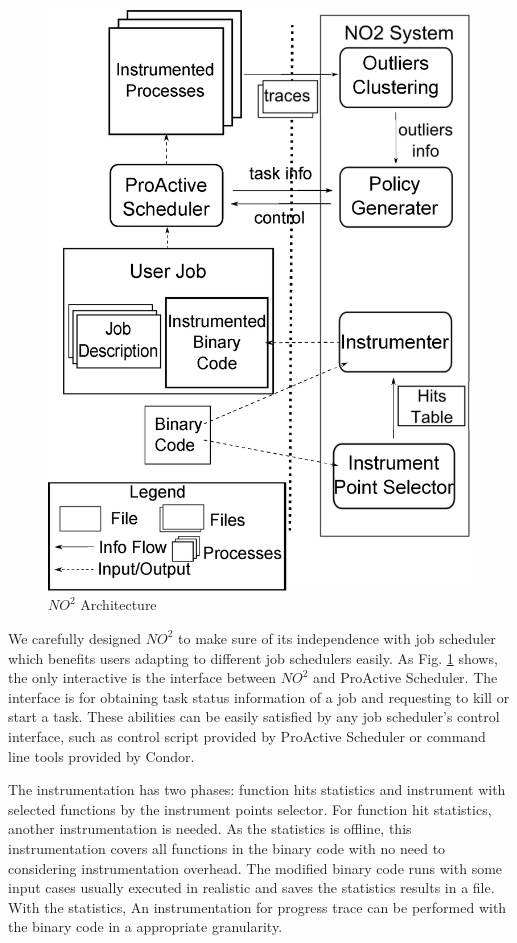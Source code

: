 \begin{figure}
\centering
\includegraphics[width=0.9\columnwidth]{figures/NO2_arch.eps}
\caption{$NO^2$ Architecture}
\label{figure:no2arch}
\end{figure}

We carefully designed $NO^2$ to make sure of its independence with job scheduler which benefits users adapting to different job schedulers easily. As Fig. \ref{figure:no2arch} shows, the only interactive is the interface between $NO^2$ and ProActive Scheduler. The interface is for obtaining task status information of a job and requesting to kill or start a task. These abilities can be easily satisfied by any job scheduler's control interface, such as control script provided by ProActive Scheduler or command line tools provided by Condor.

The instrumentation has two phases: function hits statistics and instrument with selected functions by the instrument points selector. For function hit statistics, another instrumentation is needed. As the statistics is offline, this instrumentation covers all functions in the binary code with no need to considering instrumentation overhead. The modified binary code runs with some input cases usually executed in realistic and saves the statistics results in a file. With the statistics, An instrumentation for progress trace can be performed with the binary code in a appropriate granularity.

